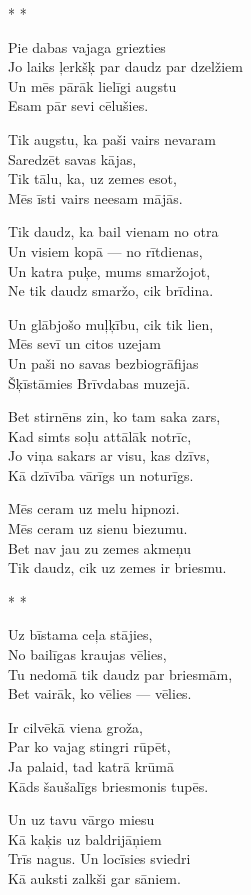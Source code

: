 \documentclass[14pt]{extarticle}
\begin{document}
\newpage

{\large \sc * * *}

Pie dabas vajaga griezties\\
Jo laiks ļerkšķ par daudz par dzelžiem\\
Un mēs pārāk lielīgi augstu\\
Esam pār sevi cēlušies.

Tik augstu, ka paši vairs nevaram\\
Saredzēt savas kājas,\\
Tik tālu, ka, uz zemes esot,\\
Mēs īsti vairs neesam mājās.

Tik daudz, ka bail vienam no otra\\
Un visiem kopā --- no rītdienas,\\
Un katra puķe, mums smaržojot,\\
Ne tik daudz smaržo, cik brīdina.

Un glābjošo muļķību, cik tik lien,\\
Mēs sevī un citos uzejam\\
Un paši no savas bezbiogrāfijas\\
Šķīstāmies Brīvdabas muzejā.

Bet stirnēns zin, ko tam saka zars,\\
Kad simts soļu attālāk notrīc,\\
Jo viņa sakars ar visu, kas dzīvs,\\
Kā dzīvība vārīgs un noturīgs.

Mēs ceram uz melu hipnozi.\\
Mēs ceram uz sienu biezumu.\\
Bet nav jau zu zemes akmeņu\\
Tik daudz, cik uz zemes ir briesmu.


\newpage

{\large \sc * * *}

Uz bīstama ceļa stājies,\\
No bailīgas kraujas vēlies,\\
Tu nedomā tik daudz par briesmām,\\
Bet vairāk, ko vēlies --- vēlies.

Ir cilvēkā viena groža,\\
Par ko vajag stingri rūpēt,\\
Ja palaid, tad katrā krūmā\\
Kāds šaušalīgs briesmonis tupēs.

Un uz tavu vārgo miesu\\
Kā kaķis uz baldrijāņiem\\
Trīs nagus. Un locīsies sviedri\\
Kā auksti zalkši gar sāniem.
\end{document}
